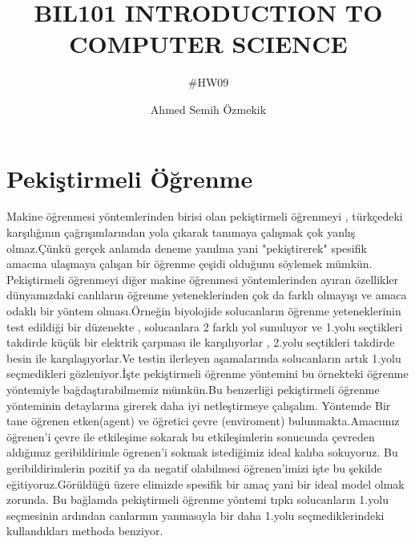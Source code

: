 \documentclass[12pt]{article}
\title{BIL101 INTRODUCTION TO COMPUTER SCIENCE}
\author{#HW09}
\date{Ahmed Semih Özmekik}
\begin{document}
\maketitle


\centering
\section{Pekiştirmeli Öğrenme}
Makine öğrenmesi yöntemlerinden birisi olan pekiştirmeli öğrenmeyi ,
	türkçedeki karşılığının çağrışımlarından yola çıkarak
	tanımaya çalışmak çok yanlış olmaz.Çünkü gerçek anlamda deneme yanılma yani "pekiştirerek"
	spesifik amacına ulaşmaya çalışan bir öğrenme çeşidi olduğunu söylemek mümkün.
	Pekiştirmeli öğrenmeyi diğer makine öğrenmesi yöntemlerinden ayıran özellikler
	dünyamızdaki canlıların öğrenme yeteneklerinden çok da farklı olmayışı ve amaca
	odaklı bir yöntem olması.Örneğin biyolojide solucanların öğrenme yeteneklerinin
	test edildiği
	bir düzenekte , solucanlara 2 farklı yol sunuluyor ve 1.yolu seçtikleri takdirde
	küçük bir elektrik çarpması ile karşılıyorlar , 2.yolu seçtikleri takdirde
	besin ile karşılaşıyorlar.Ve testin ilerleyen aşamalarında solucanların artık 1.yolu
	seçmedikleri gözleniyor.İşte pekiştirmeli öğrenme yöntemini bu örnekteki
	öğrenme yöntemiyle bağdaştırabilmemiz mümkün.Bu benzerliği pekiştirmeli öğrenme
	yönteminin detaylarına girerek daha iyi netleştirmeye çalışalım. Yöntemde
	Bir tane öğrenen etken(agent) ve öğretici çevre (enviroment) bulunmakta.Amacımız
	öğrenen'i çevre ile etkileşime sokarak bu etkileşimlerin sonucunda çevreden
	aldığımız geribildirimle ögrenen'i sokmak istediğimiz ideal kalıba sokuyoruz.
	Bu geribildirimlerin pozitif ya da negatif olabilmesi öğrenen'imizi işte bu şekilde
	eğitiyoruz.Görüldüğü üzere elimizde spesifik bir amaç yani bir ideal model olmak zorunda.
	Bu bağlamda pekiştirmeli öğrenme yöntemi tıpkı solucanların 1.yolu seçmesinin ardından
	canlarının yanmasıyla bir daha 1.yolu seçmediklerindeki kullandıkları methoda benziyor.
\end{document}
